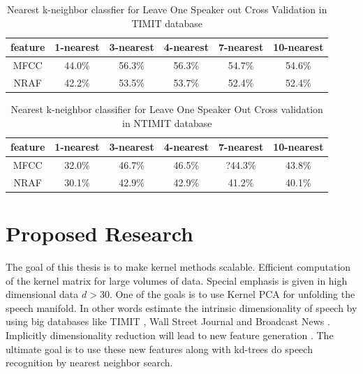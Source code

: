 \documentclass[12pt,letterpaper,doublespaced,ETD,dvips,proposal]{gtthesis}
\begin{document}
\begin{Body}
\begin{table}[!htb]
\footnotesize{ \centering
\begin{tabular}{|c|c|c|c|c|c|}
  \hline
  feature & 1-nearest & 3-nearest & 4-nearest & 7-nearest & 10-nearest \\
  \hline
  MFCC & 44.0\% & 56.3\% & 56.3\% & 54.7\% & 54.6\% \\
  NRAF & 42.2\% & 53.5\% & 53.7\% & 52.4\% & 52.4\% \\
  \hline
\end{tabular}
\caption{Nearest k-neighbor classfier for
  Leave One Speaker out Cross Validation in TIMIT database}
} \label{kneighborLOOCVTIMIT}
\end{table}

\begin{table}[!htb]
\footnotesize{ \centering
\begin{tabular}{|c|c|c|c|c|c|}
  \hline
  feature & 1-nearest & 3-nearest & 4-nearest & 7-nearest & 10-nearest \\
  \hline
  MFCC & 32.0\% & 46.7\% & 46.5\% & ?44.3\% & 43.8\% \\
  NRAF & 30.1\% & 42.9\% & 42.9\% & 41.2\% & 40.1\% \\
  \hline
\end{tabular}
  \caption{Nearest k-neighbor classifier for Leave One Speaker Out
  Cross validation in  NTIMIT database}
} \label{kneighborLOOCVNTIMIT}
\end{table}

\pagebreak
\newpage
\section{Proposed Research}
\label{proposed}

The goal of this thesis is to make kernel methods scalable.
Efficient computation of the kernel matrix for large volumes of
data. Special emphasis is given in high dimensional data $d>30$. One
of the goals is to use Kernel PCA for unfolding the speech manifold.
In other words estimate the intrinsic dimensionality of speech by
using big databases like TIMIT \cite{garofolo1993tap}, Wall Street Journal and Broadcast
News \cite{graff1997bns}. Implicitly dimensionality reduction will lead to new feature
generation . The ultimate goal is to use these new features along
with kd-trees do speech recognition by nearest neighbor search.


\end{Body}
\end{document}
